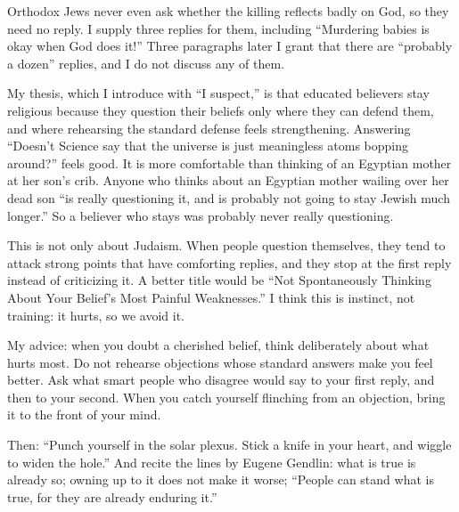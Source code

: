 Orthodox Jews never even ask whether the killing reflects badly on God, so they need no reply. I supply three replies for them, including ``Murdering babies is okay when God does it!'' Three paragraphs later I grant that there are ``probably a dozen'' replies, and I do not discuss any of them. 

My thesis, which I introduce with ``I suspect,'' is that educated believers stay religious because they question their beliefs only where they can defend them, and where rehearsing the standard defense feels strengthening. Answering ``Doesn't Science say that the universe is just meaningless atoms bopping around?'' feels good. It is more comfortable than thinking of an Egyptian mother at her son's crib. Anyone who thinks about an Egyptian mother wailing over her dead son ``is really questioning it, and is probably not going to stay Jewish much longer.'' So a believer who stays was probably never really questioning.

This is not only about Judaism. When people question themselves, they tend to attack strong points that have comforting replies, and they stop at the first reply instead of criticizing it. A better title would be ``Not Spontaneously Thinking About Your Belief's Most Painful Weaknesses.'' I think this is instinct, not training: it hurts, so we avoid it.

My advice: when you doubt a cherished belief, think deliberately about what hurts most. Do not rehearse objections whose standard answers make you feel better. Ask what smart people who disagree would say to your first reply, and then to your second. When you catch yourself flinching from an objection, bring it to the front of your mind. 

Then: ``Punch yourself in the solar plexus. Stick a knife in your heart, and wiggle to widen the hole.'' And recite the lines by Eugene Gendlin: what is true is already so; owning up to it does not make it worse; ``People can stand what is true, for they are already enduring it.''
